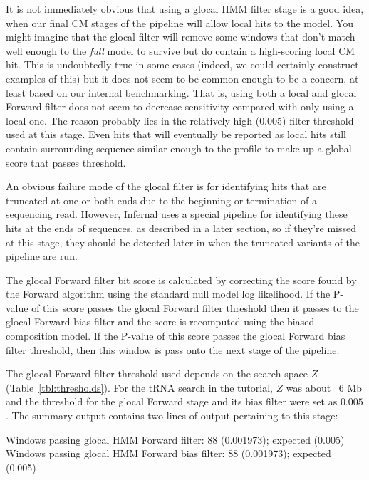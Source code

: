 \begin{sreoutput}
It is not immediately obvious that using a glocal HMM filter stage is
a good idea, when our final CM stages of the pipeline will allow local
hits to the model. You might imagine that the glocal filter will
remove some windows that don't match well enough to the \emph{full}
model to survive but do contain a high-scoring local CM hit. This is
undoubtedly true in some cases (indeed, we could certainly construct
examples of this) but it does not seem to be common enough to be a
concern, at least based on our internal benchmarking. That is, using
both a local and glocal Forward filter does not seem to decrease
sensitivity compared with only using a local one. The reason probably
lies in the relatively high ($0.005$) filter threshold used at this
stage. Even hits that will eventually be reported as local hits still
contain surrounding sequence similar enough to the profile to make up
a global score that passes threshold.

An obvious failure mode of the glocal filter is for identifying 
hits that are truncated at one or both ends due to the beginning or
termination of a sequencing read. However, Infernal uses a special
pipeline for identifying these hits at the ends of sequences, as
described in a later section, so if they're missed at this stage, they
should be detected later in when the truncated variants of the
pipeline are run.

The glocal Forward filter bit score is calculated by correcting the
score found by the Forward algorithm using the standard null model log
likelihood. If the P-value of this score passes the glocal Forward
filter threshold then it passes to the glocal Forward bias filter and the
score is recomputed using the biased composition model. If the P-value
of this score passes the glocal Forward bias filter threshold, then this
window is pass onto the next stage of the pipeline.

The glocal Forward filter threshold used depends on
the search space $Z$ (Table~\ref{tbl:thresholds}). For the tRNA search
in the tutorial, $Z$ was about ~$6$ Mb and the threshold for the glocal
Forward stage and its bias filter were set as $0.005$. The summary
output contains two lines of output pertaining to this stage:

\begin{sreoutput}
Windows   passing glocal HMM Forward       filter:              88  (0.001973); expected (0.005)
Windows   passing glocal HMM Forward  bias filter:              88  (0.001973); expected (0.005)
\end{sreoutput}


\end{sreoutput}
